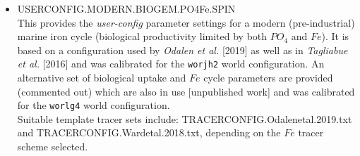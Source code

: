 \begin{itemize}[noitemsep]
\vspace{2mm}
\item \textsf{\small USERCONFIG.MODERN.BIOGEM.PO4Fe.SPIN}
\vspace{1mm}
\\This provides the \textit{user-config} parameter settings for a modern (pre-industrial) marine iron cycle (biological productivity limited by both \(PO_{4}\) and \(Fe\)). It is based on a configuration used by \textit{Odalen et al.} [2019] as well as in \textit{Tagliabue et al.} [2016] and was calibrated for the \texttt{worjh2} world configuration. An alternative set of biological uptake and \(Fe\) cycle parameters are provided (commented out) which are also in use [unpublished work] and was calibrated for the \texttt{worlg4} world configuration.
\\Suitable template tracer sets include: \textsf{\footnotesize TRACERCONFIG.Odalenetal.2019.txt} and \linebreak \textsf{\footnotesize TRACERCONFIG.Wardetal.2018.txt}, depending on the \(Fe\) tracer scheme selected.


\end{itemize}
